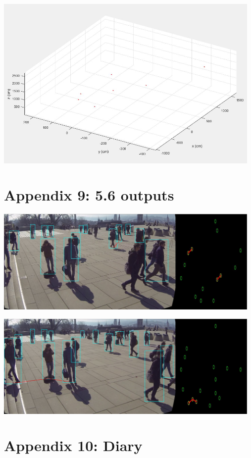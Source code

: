 \documentclass[12pt]{report}
\begin{document}
\includegraphics[width=130mm]{./images/appendix/MATLABPlot2.JPG}

\pagebreak
\section*{Appendix 9: 5.6 outputs}

\includegraphics[width=130mm]{./images/appendix/Unstable4.JPG}

\includegraphics[width=130mm]{./images/appendix/Unstable5.JPG}

\pagebreak
\section*{Appendix 10: Diary}
\end{document}
